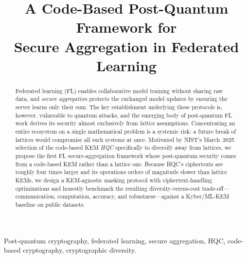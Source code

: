 \documentclass[conference]{IEEEtran}
\begin{document}
\title{A Code-Based Post-Quantum Framework for\\ Secure Aggregation in Federated Learning}

\author{
\and
{}
}

\maketitle

\begin{abstract}
Federated learning (FL) enables collaborative model training without sharing raw
data, and \emph{secure aggregation} protects the exchanged model updates by ensuring
the server learns only their sum. The key establishment underlying these protocols is,
however, vulnerable to quantum attacks, and the emerging body of post-quantum FL work
derives its security almost exclusively from \emph{lattice} assumptions. Concentrating
an entire ecosystem on a single mathematical problem is a systemic risk: a future break
of lattices would compromise all such systems at once. Motivated by NIST's March~2025
selection of the code-based KEM \emph{HQC} specifically to diversify away from lattices,
we propose the first FL secure-aggregation framework whose post-quantum security comes
from a code-based KEM rather than a lattice one. Because HQC's ciphertexts are roughly
four times larger and its operations orders of magnitude slower than lattice KEMs, we
design a KEM-agnostic masking protocol with ciphertext-handling optimizations and
honestly benchmark the resulting diversity-versus-cost trade-off---communication,
computation, accuracy, and robustness---against a Kyber/ML-KEM baseline on public datasets.
\end{abstract}

\begin{IEEEkeywords}
Post-quantum cryptography, federated learning, secure aggregation, HQC, code-based
cryptography, cryptographic diversity.
\end{IEEEkeywords}
\end{document}
